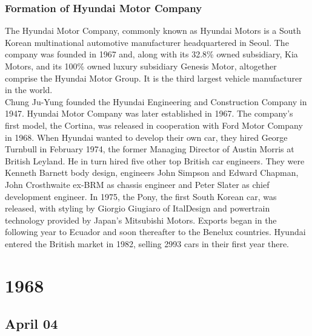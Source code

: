 \documentclass[11pt]{report}
\begin{document}
\subsection{Formation of Hyundai Motor Company}
The Hyundai Motor Company, commonly known as Hyundai Motors is a South Korean multinational automotive manufacturer headquartered in Seoul. The company was founded in 1967 and, along with its 32.8\% owned subsidiary, Kia Motors, and its 100\% owned luxury subsidiary Genesis Motor, altogether comprise the Hyundai Motor Group. It is the third largest vehicle manufacturer in the world.\\ \indent Chung Ju-Yung founded the Hyundai Engineering and Construction Company in 1947. Hyundai Motor Company was later established in 1967. The company's first model, the Cortina, was released in cooperation with Ford Motor Company in 1968. When Hyundai wanted to develop their own car, they hired George Turnbull in February 1974, the former Managing Director of Austin Morris at British Leyland. He in turn hired five other top British car engineers. They were Kenneth Barnett body design, engineers John Simpson and Edward Chapman, John Crosthwaite ex-BRM as chassis engineer and Peter Slater as chief development engineer. In 1975, the Pony, the first South Korean car, was released, with styling by Giorgio Giugiaro of ItalDesign and powertrain technology provided by Japan's Mitsubishi Motors. Exports began in the following year to Ecuador and soon thereafter to the Benelux countries. Hyundai entered the British market in 1982, selling 2993 cars in their first year there.

\chapter{1968}
\section{April 04}
\end{document}
